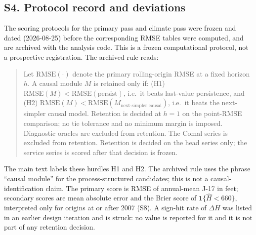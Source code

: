 \documentclass[11pt]{article}
\begin{document}
\subsection{S4. Protocol record and deviations}\label{si:edwprotocol}

The scoring protocols for the primary pass and climate pass were frozen and dated (2026-08-25) before the corresponding RMSE tables were computed, and are archived with the analysis code. This is a frozen computational protocol, not a prospective registration. The archived rule reads:

\begin{quote}\small
Let $\mathrm{RMSE}(\cdot)$ denote the primary rolling-origin RMSE at a fixed horizon $h$. A causal module $M$ is retained only if: (H1) $\mathrm{RMSE}(M) < \mathrm{RMSE}(\text{persist})$, i.e.\ it beats last-value persistence, and (H2) $\mathrm{RMSE}(M) < \mathrm{RMSE}(M_{\text{next-simpler causal}})$, i.e.\ it beats the next-simpler causal model. Retention is decided at $h=1$ on the point-RMSE comparison; no tie tolerance and no minimum margin is imposed. Diagnostic oracles are excluded from retention. The Comal series is excluded from retention. Retention is decided on the head series only; the service series is scored after that decision is frozen.
\end{quote}

The main text labels these hurdles H1 and H2. The archived rule uses the phrase ``causal module'' for the process-structured candidates; this is not a causal-identification claim. The primary score is RMSE of annual-mean J-17 in feet; secondary scores are mean absolute error and the Brier score of $\mathbf{1}\{\hat H<660\}$, interpreted only for origins at or after 2007 (S8). A sign-hit rate of $\Delta H$ was listed in an earlier design iteration and is struck: no value is reported for it and it is not part of any retention decision.
\end{document}

